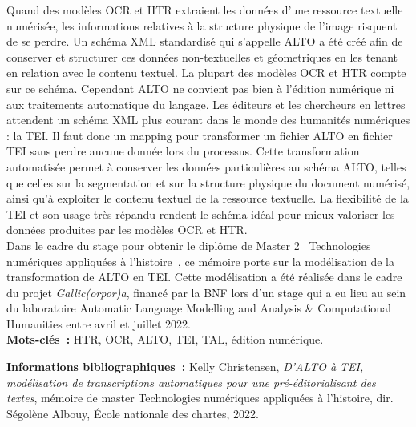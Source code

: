 \documentclass[class=article, crop=false]{standalone}
\begin{document}
\medskip

Quand des modèles \acrshort{OCR} et \acrshort{HTR} extraient les données d'une ressource textuelle numérisée, les informations relatives à la structure physique de l'image risquent de se perdre. Un schéma XML standardisé qui s'appelle \acrshort{ALTO} a été créé afin de conserver et structurer ces données non-textuelles et géometriques en les tenant en relation avec le contenu textuel. La plupart des modèles \acrshort{OCR} et \acrshort{HTR} compte sur ce schéma. Cependant \acrshort{ALTO} ne convient pas bien à l'édition numérique ni aux traitements automatique du langage. Les éditeurs et les chercheurs en lettres attendent un schéma XML plus courant dans le monde des humanités numériques : la \acrshort{TEI}. Il faut donc un mapping pour transformer un fichier \acrshort{ALTO} en fichier \acrshort{TEI} sans perdre aucune donnée lors du processus. Cette transformation automatisée permet à conserver les données particulières au schéma \acrshort{ALTO}, telles que celles sur la segmentation et sur la structure physique du document numérisé, ainsi qu'à exploiter le contenu textuel de la ressource textuelle. La flexibilité de la \acrshort{TEI} et son usage très répandu rendent le schéma idéal pour mieux valoriser les données produites par les modèles \acrshort{OCR} et \acrshort{HTR}.\\

Dans le cadre du stage pour obtenir le diplôme de Master 2 \og~Technologies numériques appliquées à l'histoire~\fg{}, ce mémoire porte sur la modélisation de la transformation de \acrshort{ALTO} en \acrshort{TEI}. Cette modélisation a été réalisée dans le cadre du projet \textit{Gallic(orpor)a}, financé par la \acrshort{BNF} lors d'un stage qui a eu lieu au sein du laboratoire Automatic Language Modelling and Analysis \& Computational Humanities entre avril et juillet 2022.\\
	
	\textbf{Mots-clés~:} HTR, OCR, ALTO, TEI, TAL, édition numérique.
	
	\textbf{Informations bibliographiques~:} Kelly Christensen, \textit{D’ALTO à TEI, modélisation de transcriptions automatiques pour une pré-éditorialisant des textes}, mémoire de master \og{}Technologies numériques appliquées à l'histoire\fg{}, dir. Ségolène Albouy, École nationale des chartes, 2022.
	
\end{document}
